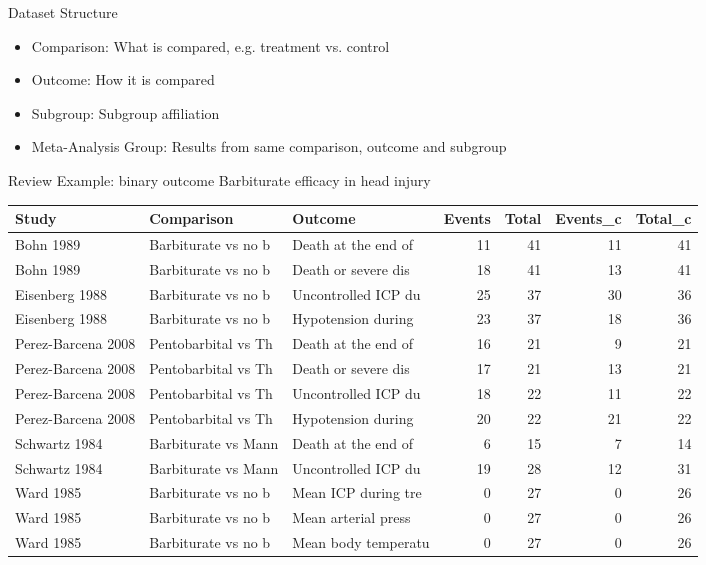 \documentclass[english]{beamer}\usepackage[]{graphicx}\usepackage[]{color}
\begin{document}
\begin{frame}{Dataset Structure}
\begin{itemize}
\item Comparison: What is compared, e.g. treatment vs. control
\item Outcome: How it is compared
\item Subgroup: Subgroup affiliation
\item Meta-Analysis Group: Results from same comparison, outcome and subgroup
\end{itemize}
\end{frame}

\begin{frame}{Review Example: binary outcome}
Barbiturate efficacy in head injury
\vspace{-5mm}
\begin{table}[ht]
\centering
\begingroup\tiny
\begin{tabular}{lllrrrr}
  \hline
Study & Comparison & Outcome & Events & Total & Events\_c & Total\_c \\ 
  \hline
Bohn 1989 & Barbiturate vs no b & Death at the end of & 11 & 41 & 11 & 41 \\ 
  Bohn 1989 & Barbiturate vs no b & Death or severe dis & 18 & 41 & 13 & 41 \\ 
  Eisenberg 1988 & Barbiturate vs no b & Uncontrolled ICP du & 25 & 37 & 30 & 36 \\ 
  Eisenberg 1988 & Barbiturate vs no b & Hypotension during  & 23 & 37 & 18 & 36 \\ 
  Perez-Barcena 2008 & Pentobarbital vs Th & Death at the end of & 16 & 21 & 9 & 21 \\ 
  Perez-Barcena 2008 & Pentobarbital vs Th & Death or severe dis & 17 & 21 & 13 & 21 \\ 
  Perez-Barcena 2008 & Pentobarbital vs Th & Uncontrolled ICP du & 18 & 22 & 11 & 22 \\ 
  Perez-Barcena 2008 & Pentobarbital vs Th & Hypotension during  & 20 & 22 & 21 & 22 \\ 
  Schwartz 1984 & Barbiturate vs Mann & Death at the end of & 6 & 15 & 7 & 14 \\ 
  Schwartz 1984 & Barbiturate vs Mann & Uncontrolled ICP du & 19 & 28 & 12 & 31 \\ 
  Ward 1985 & Barbiturate vs no b & Mean ICP during tre & 0 & 27 & 0 & 26 \\ 
  Ward 1985 & Barbiturate vs no b & Mean arterial press & 0 & 27 & 0 & 26 \\ 
  Ward 1985 & Barbiturate vs no b & Mean body temperatu & 0 & 27 & 0 & 26 \\ 
   \hline
\end{tabular}
\endgroup
\label{barbiturates}
\end{table}



\end{frame}
\end{document}
